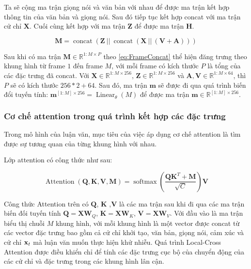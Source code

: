 Ta sẽ cộng ma trận giọng nói và văn bản với nhau để được ma trận kết hợp thông tin của văn bản và giọng nói. Sau đó tiếp tục kết hợp concat với ma trận cử chỉ $\mathbf{X}$. Cuối cùng kết hợp với ma trận $\mathbf{Z}$ để được ma trận $\mathbf{H}$.

\begin{equation}
	\label{eq:FrameConcat}
	\mathbf{M} = \operatorname{concat}( \mathbf{Z}\  || \   \operatorname{concat}(\mathbf{X}\ || \  (\mathbf{V} + \mathbf{A}) ) )
\end{equation}

Sau khi có ma trận $\mathbf{M} \in \mathbb{R}^{1:M \times P}$ theo \autoref{eq:FrameConcat} thể hiện đăng trưng theo khung hình từ frame $1$ đến frame $M$, với mỗi frame có kích thước $P$ là tổng của các đặc trưng đã concat. Với $\mathbf{X} \in \mathbb{R}^{1:M \times 256}$, $\mathbf{Z} \in \mathbb{R}^{1:M \times 256}$ và $\mathbf{A}, \mathbf{V} \in \mathbb{R}^{1:M \times 64}$, thì $P$ sẽ có kích thước $256 * 2 + 64$. Sau đó, ma trận $\mathbf{m}$ sẽ được đi qua quá trình biến đổi tuyến tính: $\mathbf{m}^{[1:M] \times 256} = \operatorname{Linear}_{\theta}(M)$ để được ma trận $\mathbf{m} \in \mathbb{R}^{[1:M] \times 256}$.

\subsubsection{Cơ chế attention trong quá trình kết hợp các đặc trưng}

Trong mô hình của luận văn, mục tiêu của việc áp dụng cơ chế attention là tìm được sự tương quan của từng khung hình với nhau.

Lớp attention có công thức như sau:

\begin{equation} \label{eq:attention}
	\operatorname{Attention}(\mathbf{Q}, \mathbf{K}, \mathbf{V}, \mathbf{M})=\operatorname{softmax}\left(\frac{\mathbf{Q} \mathbf{K}^{T}+\mathbf{M}}{\sqrt{C}}\right) \mathbf{V}
\end{equation}

Công thức Attention trên có $\mathbf{Q}$, $\mathbf{K}$ ,$\mathbf{V}$ là các ma trận sau khi đi qua các ma trận biến đối tuyến tính $\mathbf{Q} = \mathbf{X} \mathbf{W}_Q$, $\mathbf{K} = \mathbf{X} \mathbf{W}_K$, $\mathbf{V} = \mathbf{X} \mathbf{W}_V$. Với đầu vào là ma trận biểu thị chuỗi $M$ khung hình, với mỗi khung hình là một vector được concat từ các vector đặc trưng bao gồm cả cử chỉ khởi tạo, văn bản, giọng nói, cảm xúc và cử chỉ $\mathbf{x}_t$ mà luận văn muốn thực hiện khử nhiễu. Quá trình Local-Cross Attention được điều khiển chỉ để tính các đặc trưng cục bộ của chuyển động của các cử chỉ và đặc trưng trong các khung hình lân cận.

